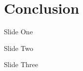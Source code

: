 \section{Conclusion}

\begin{frame}{Slide One}

\end{frame}

\begin{frame}{Slide Two}

\end{frame}

\begin{frame}{Slide Three}

\end{frame}